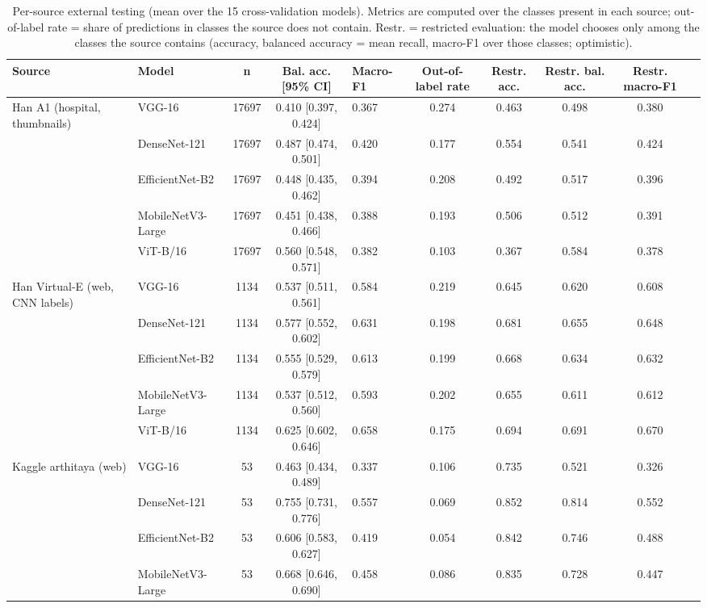 \begin{table}[!tbp]
\centering
\caption{Per-source external testing (mean over the 15 cross-validation models). Metrics are computed over the classes present in each source; out-of-label rate = share of predictions in classes the source does not contain. Restr. = restricted evaluation: the model chooses only among the classes the source contains (accuracy, balanced accuracy = mean recall, macro-F1 over those classes; optimistic).}
\label{tab:external}
\footnotesize
\begin{tabular}{llcclccccc}
\hline
Source & Model & n & Bal. acc. [95\% CI] & Macro-F1 & Out-of-label rate & Restr. acc. & Restr. bal. acc. & Restr. macro-F1 \\
\hline
Han A1 (hospital, thumbnails) & VGG-16 & 17697 & 0.410 [0.397, 0.424] & 0.367 & 0.274 & 0.463 & 0.498 & 0.380 \\
 & DenseNet-121 & 17697 & 0.487 [0.474, 0.501] & 0.420 & 0.177 & 0.554 & 0.541 & 0.424 \\
 & EfficientNet-B2 & 17697 & 0.448 [0.435, 0.462] & 0.394 & 0.208 & 0.492 & 0.517 & 0.396 \\
 & MobileNetV3-Large & 17697 & 0.451 [0.438, 0.466] & 0.388 & 0.193 & 0.506 & 0.512 & 0.391 \\
 & ViT-B/16 & 17697 & 0.560 [0.548, 0.571] & 0.382 & 0.103 & 0.367 & 0.584 & 0.378 \\
Han Virtual-E (web, CNN labels) & VGG-16 & 1134 & 0.537 [0.511, 0.561] & 0.584 & 0.219 & 0.645 & 0.620 & 0.608 \\
 & DenseNet-121 & 1134 & 0.577 [0.552, 0.602] & 0.631 & 0.198 & 0.681 & 0.655 & 0.648 \\
 & EfficientNet-B2 & 1134 & 0.555 [0.529, 0.579] & 0.613 & 0.199 & 0.668 & 0.634 & 0.632 \\
 & MobileNetV3-Large & 1134 & 0.537 [0.512, 0.560] & 0.593 & 0.202 & 0.655 & 0.611 & 0.612 \\
 & ViT-B/16 & 1134 & 0.625 [0.602, 0.646] & 0.658 & 0.175 & 0.694 & 0.691 & 0.670 \\
Kaggle arthitaya (web) & VGG-16 & 53 & 0.463 [0.434, 0.489] & 0.337 & 0.106 & 0.735 & 0.521 & 0.326 \\
 & DenseNet-121 & 53 & 0.755 [0.731, 0.776] & 0.557 & 0.069 & 0.852 & 0.814 & 0.552 \\
 & EfficientNet-B2 & 53 & 0.606 [0.583, 0.627] & 0.419 & 0.054 & 0.842 & 0.746 & 0.488 \\
 & MobileNetV3-Large & 53 & 0.668 [0.646, 0.690] & 0.458 & 0.086 & 0.835 & 0.728 & 0.447 \\

\end{tabular}
\end{table}
